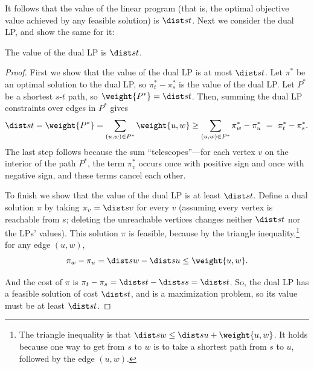 It follows that the value of the linear program (that is, the optimal objective value achieved by any feasible solution)
is $\dist s t$.
Next we consider the dual LP, and show the same for it:

\begin{lemma}\label{flow: lemma: dual LP value}
  The value of the dual LP is $\dist s t$.
\end{lemma}
\begin{proof}
  First we show that the value of the dual LP is at most $\dist s t$.
  Let $\pi^*$ be an optimal solution to the dual LP, so $\pi^*_t - \pi^*_s$ is the value of the dual LP.
  Let $P^*$ be a shortest $s$-$t$ path, so $\weight {P^*} = \dist s t$.
  Then, summing the dual LP constraints over edges in $P^*$ gives
  \[
    \dist s t
    = \weight {P^*}
    = \sum_{(u,w)\in P^*} \weight {u, w}
    \ge \sum_{(u,w)\in P^*} \pi^*_w - \pi^*_u
    ~=~ \pi^*_t - \pi^*_s.
  \]
  The last step follows because the sum ``telescopes''---for each vertex $v$ on the interior of the path $P^*$,
  the term $\pi^*_v$ occurs once with positive sign and once with negative sign,
  and these terms cancel each other.

  To finish we show that the value of the dual LP is at least $\dist s t$.
  Define a dual solution $\pi$ by taking $\pi_v = \dist s v$ for every $v$
  (assuming every vertex is reachable from $s$; deleting the unreachable vertices changes neither $\dist s t$ nor the LPs' values).
  This solution $\pi$ is feasible, because by the triangle inequality,\footnote
  {The triangle inequality is that $\dist s w \le \dist s u + \weight {u, w}$.
    It holds because one way to get from $s$ to $w$ is to take a shortest path from $s$ to $u$,
    followed by the edge $(u, w)$.}
  for any edge $(u, w)$,
  \[
    \pi_w - \pi_u = \dist s w - \dist s u \le \weight {u, w}.
  \]
  
  And the cost of $\pi$ is $\pi_t - \pi_s = \dist s t - \dist s s = \dist s t$. 
  So, the dual LP has a feasible solution of cost $\dist s t$,
  and is a maximization problem, so its value must be at least $\dist s t$.
\end{proof}

